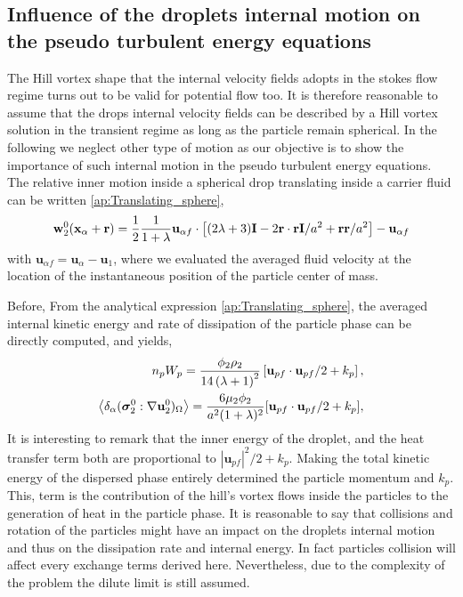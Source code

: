 
\subsection{Influence of the droplets internal motion on the pseudo turbulent energy equations}

The Hill vortex shape that the internal velocity fields adopts in the stokes flow regime turns out to be valid for potential flow too. 
It is therefore reasonable to assume that the drops internal velocity fields can be described by a Hill vortex solution in the transient regime as long as the particle remain spherical. 
In the following we neglect other type of motion as our objective is to show the importance of such internal motion in the pseudo turbulent energy equations. 
The relative inner motion inside a spherical drop translating inside a carrier fluid can be written \ref{ap:Translating_sphere},
\begin{equation}
    \textbf{w}_2^0(\textbf{x}_\alpha + \textbf{r}) = 
    \frac{1}{2}\frac{1}{1+\lambda} \textbf{u}_{\alpha f}\cdot \left[
        (2\lambda+3)\textbf{I}
        - 2 \textbf{r}\cdot \textbf{r} \textbf{I}/a^2
        + \textbf{rr}/a^2
    \right] - \textbf{u}_{\alpha f}\\
    \label{eq:wa_def}
\end{equation}
with $\textbf{u}_{\alpha f} = \textbf{u}_\alpha - \textbf{u}_1$, where we evaluated the averaged fluid velocity at the location of the instantaneous position of the particle center of mass. 

Before, 
From the analytical expression \ref{ap:Translating_sphere}, the averaged internal kinetic energy and rate of dissipation of the particle phase can be directly computed, and yields, 
\begin{align*}
    n_p W_p 
    =\frac{\phi_2\rho_2}{14 \left(\lambda +1\right)^2} 
    \left[
        \textbf{u}_{p f}\cdot \textbf{u}_{p f}/2+k_p
    \right],\\
    \left<\delta_\alpha ( \bm{\sigma}_2^0:\mathbf{\nabla} \textbf{u}_2^0 )_{\Omega}\right>
    = \frac{6 \mu_2 \phi_2}{a^2(1+\lambda)^2}
    [\textbf{u}_{p f}\cdot \textbf{u}_{p f} /2  
    +  k_p],
\end{align*}
It is interesting to remark that the inner energy of the droplet, and the heat transfer term both are proportional to $|\textbf{u}_{p f}|^2 /2 +  k_p$.
Making the total kinetic energy of the dispersed phase entirely determined the particle momentum and $k_p$.  
This, term is the contribution of the hill's vortex flows inside the particles to the generation of heat in the particle phase. 
It is reasonable to say that collisions and rotation of the particles might have an impact on the droplets internal motion and thus on the dissipation rate and internal energy. 
In fact particles collision will affect every exchange terms derived here. 
Nevertheless, due to the complexity of the problem the dilute limit is still assumed. 

